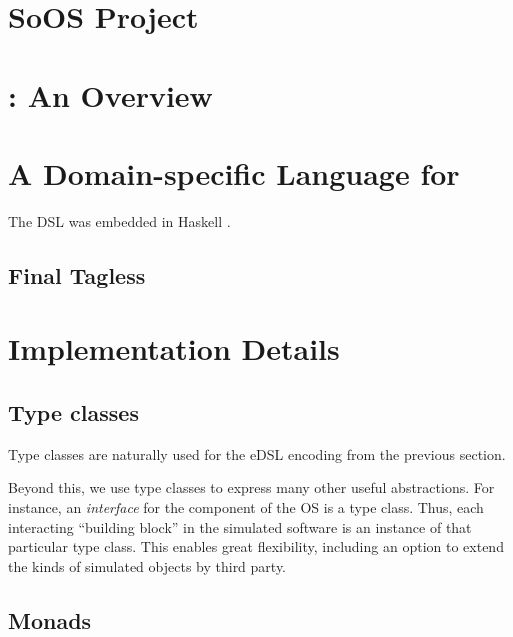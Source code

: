 \section{SoOS Project}
\label{sec:soos-project}

\section{\soosim: An Overview}
\label{sec:soosim-an-overview}


\section{A Domain-specific Language for \soosim}
\label{sec:dsl}

The DSL was embedded in Haskell \cite{haskell-report}.

\subsection{Final Tagless}


\section{Implementation Details}
\label{sec:impl-detail}

\subsection{Type classes}

Type classes are naturally used for the eDSL encoding from the
previous section.  

Beyond this, we use type classes to express many
other useful abstractions. For instance, an \emph{interface} for the
component of the OS is a type class. Thus, each interacting ``building
block'' in the simulated software is an instance of that particular
type class. This enables great flexibility, including an option to
extend the kinds of simulated objects by third party.

\subsection{Monads}

